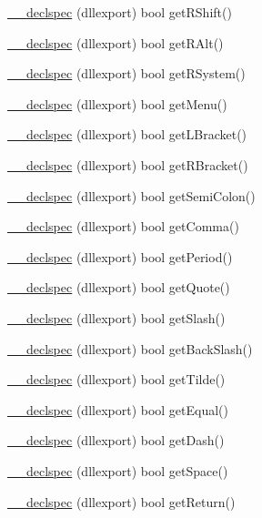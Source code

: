 \begin{DoxyCompactItemize}
\hyperlink{class_keyboard_a9cd939f731ed9860dcaf84c2e04c2f16}{\-\_\-\-\_\-declspec} (dllexport) bool get\-R\-Shift()
\item 
\hyperlink{class_keyboard_a0bb4753677e3a5e37aad2cd909d7d534}{\-\_\-\-\_\-declspec} (dllexport) bool get\-R\-Alt()
\item 
\hyperlink{class_keyboard_a9391ff2ab6303e8c656717816a5daa63}{\-\_\-\-\_\-declspec} (dllexport) bool get\-R\-System()
\item 
\hyperlink{class_keyboard_afc19a1345b3f3c640caa05f8537963b6}{\-\_\-\-\_\-declspec} (dllexport) bool get\-Menu()
\item 
\hyperlink{class_keyboard_a8ac07ce24231fb88371533b655219af4}{\-\_\-\-\_\-declspec} (dllexport) bool get\-L\-Bracket()
\item 
\hyperlink{class_keyboard_ae07e7ac0c04408d840a7e70c6aa5284e}{\-\_\-\-\_\-declspec} (dllexport) bool get\-R\-Bracket()
\item 
\hyperlink{class_keyboard_a104279972198f27ebbb3ea61485b9cb2}{\-\_\-\-\_\-declspec} (dllexport) bool get\-Semi\-Colon()
\item 
\hyperlink{class_keyboard_ab064d29caa63e85da20a124ddaabb197}{\-\_\-\-\_\-declspec} (dllexport) bool get\-Comma()
\item 
\hyperlink{class_keyboard_a435113865c4ebec40ab40d93c389894b}{\-\_\-\-\_\-declspec} (dllexport) bool get\-Period()
\item 
\hyperlink{class_keyboard_a91a44faed8c4a8545dbbb2e4ca8e9a67}{\-\_\-\-\_\-declspec} (dllexport) bool get\-Quote()
\item 
\hyperlink{class_keyboard_a8248da3c06f94a43117b8e1114aae7dc}{\-\_\-\-\_\-declspec} (dllexport) bool get\-Slash()
\item 
\hyperlink{class_keyboard_a2e7c4af49fa9c1aaa167c19b21acd5d7}{\-\_\-\-\_\-declspec} (dllexport) bool get\-Back\-Slash()
\item 
\hyperlink{class_keyboard_ab38a5375546de22f671e3c52b0d6959c}{\-\_\-\-\_\-declspec} (dllexport) bool get\-Tilde()
\item 
\hyperlink{class_keyboard_aed01440377be9d556565c26568d0c24d}{\-\_\-\-\_\-declspec} (dllexport) bool get\-Equal()
\item 
\hyperlink{class_keyboard_a6f5a3b5422fec7c1fcf94e96cb1362ba}{\-\_\-\-\_\-declspec} (dllexport) bool get\-Dash()
\item 
\hyperlink{class_keyboard_a275463e7bf69faeaa3c67991fdd0afa6}{\-\_\-\-\_\-declspec} (dllexport) bool get\-Space()
\item 
\hyperlink{class_keyboard_af8fee7e64666be44408584cc9c0f8a50}{\-\_\-\-\_\-declspec} (dllexport) bool get\-Return()

\end{DoxyCompactItemize}
